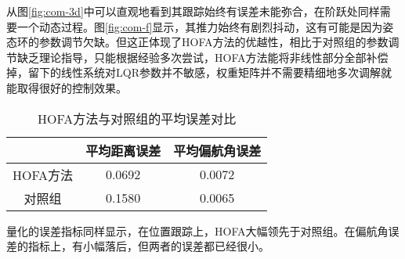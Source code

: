      从图\ref{fig:com-3d}中可以直观地看到其跟踪始终有误差未能弥合，在阶跃处同样需要一个动态过程。图\ref{fig:com-f}显示，其推力始终有剧烈抖动，这有可能是因为姿态环的参数调节欠缺。但这正体现了HOFA方法的优越性，相比于对照组的参数调节缺乏理论指导，只能根据经验多次尝试，HOFA方法能将非线性部分全部补偿掉，留下的线性系统对LQR参数并不敏感，权重矩阵并不需要精细地多次调解就能取得很好的控制效果。
     \begin{table}
      \centering
      \begin{tabular}{ccc}
          \toprule
          & 平均距离误差 & 平均偏航角误差 \\
          \midrule
          HOFA方法 & 0.0692 & 0.0072 \\
          对照组 & 0.1580 & 0.0065 \\
          \bottomrule
      \end{tabular}
      \caption{HOFA方法与对照组的平均误差对比}
  \end{table}

  量化的误差指标同样显示，在位置跟踪上，HOFA大幅领先于对照组。在偏航角误差的指标上，有小幅落后，但两者的误差都已经很小。